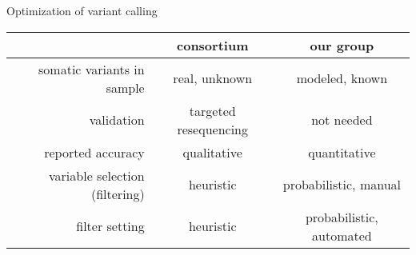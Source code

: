 \documentclass{beamer}
\begin{document}
\begin{frame}{Optimization of variant calling}
\small
\begin{tabular}{r|cc}
& consortium & our group \\
\hline
somatic variants in sample & real, unknown & modeled, known \\
validation & targeted resequencing & not needed \\
reported accuracy & qualitative & quantitative \\
variable selection (filtering) & heuristic & probabilistic, manual \\
filter setting & heuristic & probabilistic, automated \\
\end{tabular}
\end{frame}
\end{document}
